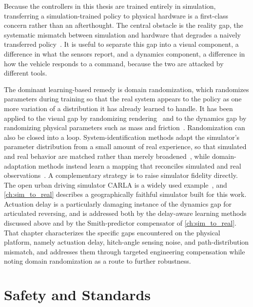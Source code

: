 Because the controllers in this thesis are trained entirely in simulation, transferring a simulation-trained policy to physical hardware is a first-class concern rather than an afterthought. The central obstacle is the reality gap, the systematic mismatch between simulation and hardware that degrades a naively transferred policy~\cite{zhao2020sim2real}. It is useful to separate this gap into a visual component, a difference in what the sensors report, and a dynamics component, a difference in how the vehicle responds to a command, because the two are attacked by different tools.

The dominant learning-based remedy is domain randomization, which randomizes parameters during training so that the real system appears to the policy as one more variation of a distribution it has already learned to handle. It has been applied to the visual gap by randomizing rendering~\cite{tobin2017domain} and to the dynamics gap by randomizing physical parameters such as mass and friction~\cite{peng2018dynamicsrand}. Randomization can also be closed into a loop. System-identification methods adapt the simulator's parameter distribution from a small amount of real experience, so that simulated and real behavior are matched rather than merely broadened~\cite{chebotar2019closingloop}, while domain-adaptation methods instead learn a mapping that reconciles simulated and real observations~\cite{bousmalis2018domainadapt}. A complementary strategy is to raise simulator fidelity directly. The open urban driving simulator CARLA is a widely used example~\cite{dosovitskiy2017carla}, and \cref{ch:sim_to_real} describes a geographically faithful simulator built for this work. Actuation delay is a particularly damaging instance of the dynamics gap for articulated reversing, and is addressed both by the delay-aware learning methods discussed above and by the Smith-predictor compensator of \cref{ch:sim_to_real}. That chapter characterizes the specific gaps encountered on the physical platform, namely actuation delay, hitch-angle sensing noise, and path-distribution mismatch, and addresses them through targeted engineering compensation while noting domain randomization as a route to further robustness.

\section{Safety and Standards}

